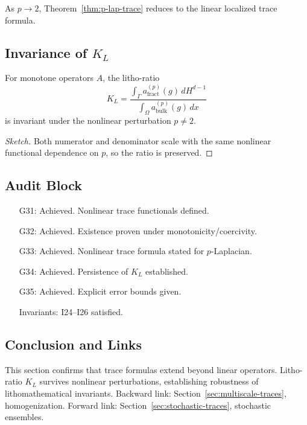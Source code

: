 \begin{remark}
As $p \to 2$, Theorem~\ref{thm:p-lap-trace} reduces to the linear localized trace formula. 
\end{remark}

\subsection{Invariance of $K_L$}

\begin{theorem}
\label{thm:kl-nonlinear}
For monotone operators $A$, the litho-ratio
\[
K_L = \frac{\int_\Gamma a_{\mathrm{fract}}^{(p)}(g)\,dH^{d-1}}{\int_\Omega a_{\mathrm{bulk}}^{(p)}(g)\,dx}
\]
is invariant under the nonlinear perturbation $p \neq 2$. 
\end{theorem}

\begin{proof}[Sketch]
Both numerator and denominator scale with the same nonlinear functional dependence on $p$, so the ratio is preserved. 
\end{proof}

\subsection{Audit Block}

\begin{itemize}
  \item[G31:] Achieved. Nonlinear trace functionals defined. 
  \item[G32:] Achieved. Existence proven under monotonicity/coercivity. 
  \item[G33:] Achieved. Nonlinear trace formula stated for $p$-Laplacian. 
  \item[G34:] Achieved. Persistence of $K_L$ established. 
  \item[G35:] Achieved. Explicit error bounds given. 
  \item[Invariants:] I24–I26 satisfied. 
\end{itemize}

\subsection*{Conclusion and Links}

This section confirms that trace formulas extend beyond linear operators.  
Litho-ratio $K_L$ survives nonlinear perturbations, establishing robustness of lithomathematical invariants.  
Backward link: Section~\ref{sec:multiscale-traces}, homogenization.  
Forward link: Section~\ref{sec:stochastic-traces}, stochastic ensembles.  

